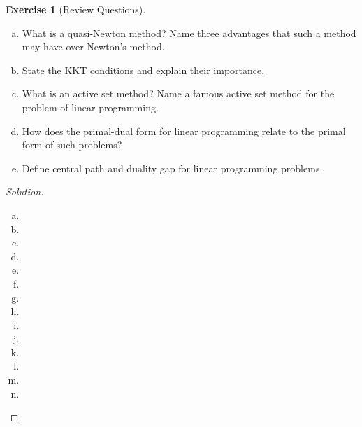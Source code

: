 \documentclass[12pt,a4]{article}
\theoremstyle{definition}
\newtheorem{exercise}{Exercise}
\begin{document}
\begin{exercise}[Review Questions]
\begin{enumerate}[(a)]
		\item What is a quasi-Newton method? Name three advantages that such a method may have over Newton’s method.
		
		\item State the KKT conditions and explain their importance.
		
		\item What is an active set method? Name a famous active set method for the problem of linear programming.
		
		\item How does the primal-dual form for linear programming relate to the primal form of such problems?
		
		\item Define central path and duality gap for linear programming problems.
		
	\end{enumerate}
\end{exercise}
\begin{proof}[Solution]
	\begin{enumerate}[(a)]
		\item 
		
		\item 
		
		\item 
		
		\item 
		
		\item 
		
		\item 
		
		\item 
		
		\item 
		
		\item 
		
		\item 
		
		\item 
		
		\item 
		
		\item 
		
		\item 
	\end{enumerate}
\end{proof}
\end{document}
